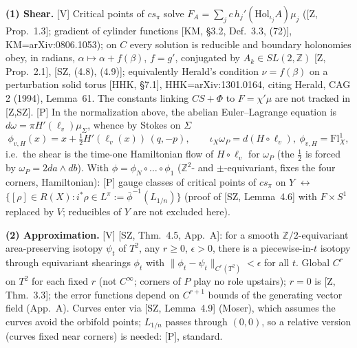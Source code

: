 \smallskip\noindent\textbf{(1) Shear.} [V] Critical points of $cs_\pi$ solve $F_A=\sum_j c\,h_j'(\mathrm{Hol}_{\iota_j}A)\mu_j$
([Z, Prop.~1.3]; gradient of cylinder functions [KM, \S3.2, Def.~3.3, (72)], KM=arXiv:0806.1053);
on $C$ every solution is reducible and boundary holonomies obey, in radians,
$\alpha\mapsto\alpha+f(\beta)$, $f=g'$, conjugated by $A_k\in SL(2,\mathbb Z)$ [Z, Prop.~2.1], [SZ, (4.8), (4.9)];
equivalently Herald's condition $\nu=f(\beta)$ on a perturbation solid torus [HHK, \S7.1],
HHK=arXiv:1301.0164, citing Herald, CAG 2 (1994), Lemma~61. The constants linking $CS+\Phi$ to $F=\chi'\mu$
are not tracked in [Z,SZ]. [P] In the normalization above, the abelian Euler--Lagrange equation is
$d\omega=\pi H'(\ell_v)\mu_\Sigma$, whence by Stokes on $\Sigma$
\begin{equation}\label{collar:shear}
\phi_{v,H}(x)=x+\tfrac12H'(\ell_v(x))\,(q,-p),\qquad \iota_{X}\omega_P=d(H\circ\ell_v),\ \phi_{v,H}=\mathrm{Fl}^1_{X},
\end{equation}
i.e.\ the shear is the time-one Hamiltonian flow of $H\circ\ell_v$ for $\omega_P$ (the $\frac12$ is forced by $\omega_P=2da\wedge db$).
With $\phi=\phi_N\circ\dots\circ\phi_1$ ($\mathbb Z^2$- and $\pm$-equivariant, fixes the four corners, Hamiltonian):
[P] gauge classes of critical points of $cs_\pi$ on $Y$ $\leftrightarrow$ $\{[\rho]\in R(X): i^*\rho\in L^\pi:=\bar\phi^{-1}(L_{1/n})\}$
(proof of [SZ, Lemma~4.6] with $F\times S^1$ replaced by $V$; reducibles of $Y$ are not excluded here).

\smallskip\noindent\textbf{(2) Approximation.} [V] [SZ, Thm.~4.5, App.~A]: for a smooth $\mathbb Z/2$-equivariant
area-preserving isotopy $\psi_t$ of $T^2$, any $r\ge0$, $\epsilon>0$, there is a piecewise-in-$t$ isotopy through
equivariant shearings $\phi_t$ with $\|\phi_t-\psi_t\|_{C^r(T^2)}<\epsilon$ for all $t$. Global $C^r$ on $T^2$ for
each fixed $r$ (not $C^\infty$; corners of $P$ play no role upstairs); $r=0$ is [Z, Thm.~3.3]; the error functions
depend on $C^{r+1}$ bounds of the generating vector field (App.~A). Curves enter via [SZ, Lemma~4.9]
(Moser), which assumes the curves avoid the orbifold points; $L_{1/n}$ passes through $(0,0)$, so a relative
version (curves fixed near corners) is needed: [P], standard.

